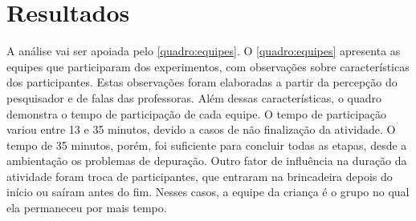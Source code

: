 \chapter{Resultados}
\label{c_resultados}


A análise vai ser apoiada pelo \autoref{quadro:equipes}. O \autoref{quadro:equipes} apresenta as equipes que participaram dos experimentos, com observações sobre características dos participantes. Estas observações foram elaboradas a partir da percepção do pesquisador e de falas das professoras. Além dessas características, o quadro demonstra o tempo de participação de cada equipe. O tempo de participação variou entre 13 e 35 minutos, devido a casos de não finalização da atividade. O tempo de 35 minutos, porém, foi suficiente para concluir todas as etapas, desde a ambientação os problemas de depuração. Outro fator de influência na duração da atividade foram troca de participantes, que entraram na brincadeira depois do início ou saíram antes do fim. Nesses casos, a equipe da criança é o grupo no qual ela permaneceu por mais tempo.

